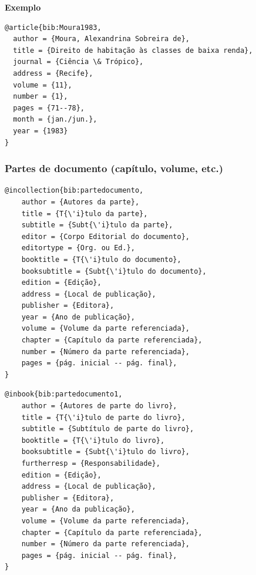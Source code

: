 \documentclass[a4paper,12pt,oneside,onecolumn,final,fleqn]{repUERJ}
\begin{document}
\noindent\textbf{Exemplo}\\

\noindent{}

\begin{verbatim}
@article{bib:Moura1983,
  author = {Moura, Alexandrina Sobreira de},
  title = {Direito de habitação às classes de baixa renda},
  journal = {Ciência \& Trópico},
  address = {Recife},
  volume = {11},
  number = {1},
  pages = {71--78},
  month = {jan./jun.},
  year = {1983}
}
\end{verbatim}


\subsubsection{Partes de documento (capítulo, volume, etc.)}

\noindent{}

\begin{verbatim}
@incollection{bib:partedocumento,
    author = {Autores da parte},
    title = {T{\'i}tulo da parte},
    subtitle = {Subt{\'i}tulo da parte},
    editor = {Corpo Editorial do documento},
    editortype = {Org. ou Ed.},
    booktitle = {T{\'i}tulo do documento},
    booksubtitle = {Subt{\'i}tulo do documento},
    edition = {Edição},
    address = {Local de publicação},
    publisher = {Editora},
    year = {Ano de publicação},
    volume = {Volume da parte referenciada},
    chapter = {Capítulo da parte referenciada},
    number = {Número da parte referenciada},
    pages = {pág. inicial -- pág. final},
}
\end{verbatim}

\noindent{}

\begin{verbatim}
@inbook{bib:partedocumento1,
    author = {Autores de parte do livro},
    title = {T{\'i}tulo de parte do livro},
    subtitle = {Subtítulo de parte do livro},
    booktitle = {T{\'i}tulo do livro},
    booksubtitle = {Subt{\'i}tulo do livro},
    furtherresp = {Responsabilidade},
    edition = {Edição},
    address = {Local de publicação},
    publisher = {Editora},
    year = {Ano da publicação},
    volume = {Volume da parte referenciada},
    chapter = {Capítulo da parte referenciada},
    number = {Número da parte referenciada},
    pages = {pág. inicial -- pág. final},
}
\end{verbatim}
\end{document}
